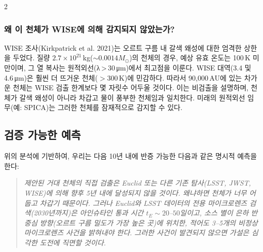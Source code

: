 \documentclass[12pt,a4paper]{article}
\begin{document}
\begin{multicols}{2}
		\subsubsection{왜 이 천체가 WISE에 의해 감지되지 않았는가?}
		WISE 조사(Kirkpatrick et al. 2021)는 오르트 구름 내 갈색 왜성에 대한 엄격한 상한을 두었다. 질량 \(2.7\times10^{21}\) kg(\(\sim 0.0014 M_{\odot}\))의 천체의 경우, 예상 유효 온도는 100 K 미만이며, 그 열 복사는 원적외선(λ > 30 μm)에서 최고점을 이룬다. WISE 대역(3.4 및 4.6 μm)은 훨씬 더 뜨거운 천체(\(>300\) K)에 민감하다. 따라서 90,000 AU에 있는 차가운 천체는 WISE 검출 한계보다 몇 자릿수 어두울 것이다. 이는 비검출을 설명하며, 천체가 갈색 왜성이 아니라 차갑고 물이 풍부한 천체임과 일치한다. 미래의 원적외선 임무(예: SPICA)는 그러한 천체를 잠재적으로 감지할 수 있다.
		
		\subsection{검증 가능한 예측}
		위의 분석에 기반하여, 우리는 다음 10년 내에 반증 가능한 다음과 같은 명시적 예측을 한다:
		\begin{quote}
			\itshape
			제안된 거대 천체의 직접 검출은 Euclid 또는 다른 기존 탐사(LSST, JWST, WISE)에 의해 향후 5년 내에 달성되지 않을 것이다. 왜냐하면 천체가 너무 어둡고 차갑기 때문이다. 그러나 Euclid와 LSST 데이터의 전용 마이크로렌즈 검색(2030년까지)은 아인슈타인 통과 시간 \(t_E \sim 20\)–\(50\)일이고, 소스 별이 은하 반중심 방향(오르트 구름 밀도가 가장 높은 곳)에 위치한, 적어도 3–5개의 비정상 마이크로렌즈 사건을 밝혀내야 한다. 그러한 사건이 발견되지 않으면 가설은 심각한 도전에 직면할 것이다.
		\end{quote}
		
	\end{multicols}
	
\end{document}
